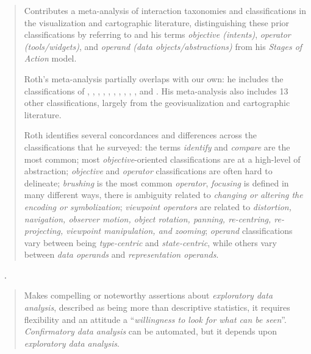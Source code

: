 \begin{quotation}
    Contributes a meta-analysis of interaction taxonomies and classifications in the visualization and cartographic literature, distinguishing these prior classifications by referring to \citet{Norman1988} and his terms {\it  objective (intents)}, {\it operator (tools/widgets)}, and {\it operand (data objects/abstractions)} from his {\it Stages of Action} model.
    
    Roth's meta-analysis partially overlaps with our own: he includes the classifications of \citet{Amar2005}, \citet{Buja1996}, \citet{Chi1998}, \citet{Chuah1996}, \citet{Dix1998}, \citet{Keim2002}, \citet{Shneiderman1996}, \citet{Ward2004}, \citet{Wehrend1990}, \citet{Yi2007}, and \citet{Zhou1998}.
    His meta-analysis also includes 13 other classifications, largely from the geovisualization and cartographic literature.
    
    Roth identifies several concordances and differences across the classifications that he surveyed: the terms {\it identify} and {\it compare} are the most common; most {\it objective}-oriented classifications are at a high-level of abstraction; {\it objective} and {\it operator} classifications are often hard to delineate; {\it brushing} is the most common {\it operator}, {\it focusing} is defined in many different ways, there is ambiguity related to {\it changing or altering the encoding or symbolization}; {\it viewpoint operators} are related to {\it distortion, navigation, observer motion, object rotation, panning, re-centring, re-projecting, viewpoint manipulation, and zooming}; {\it operand} classifications vary between being {\it type-centric} and {\it state-centric}, while others vary between {\it data operands} and {\it representation operands}.
\end{quotation}

\begin{sloppypar}
~\cite{Tukey1977}. \end{sloppypar}

\begin{quotation}
    Makes compelling or noteworthy assertions about {\it exploratory data analysis}, described as being more than descriptive statistics, it requires flexibility and an attitude a ``{\it willingness to look for what can be seen}''. 
    {\it Confirmatory data analysis} can be automated, but it depends upon {\it exploratory data analysis}.
\end{quotation}

